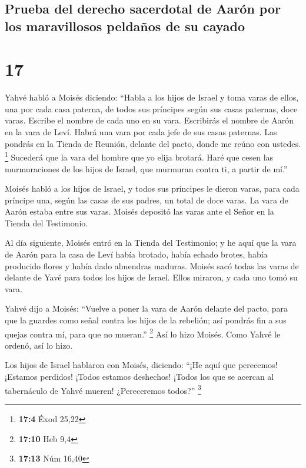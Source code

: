 \hypertarget{prueba-del-derecho-sacerdotal-de-aaruxf3n-por-los-maravillosos-peldauxf1os-de-su-cayado}{%
\subsection{Prueba del derecho sacerdotal de Aarón por los maravillosos
peldaños de su
cayado}\label{prueba-del-derecho-sacerdotal-de-aaruxf3n-por-los-maravillosos-peldauxf1os-de-su-cayado}}

\hypertarget{section-16}{%
\section{17}\label{section-16}}

 Yahvé habló a Moisés diciendo:  ``Habla a
los hijos de Israel y toma varas de ellos, una por cada casa paterna, de
todos sus príncipes según sus casas paternas, doce varas. Escribe el
nombre de cada uno en su vara.  Escribirás el nombre de
Aarón en la vara de Leví. Habrá una vara por cada jefe de sus casas
paternas.  Las pondrás en la Tienda de Reunión, delante
del pacto, donde me reúno con ustedes. \footnote{\textbf{17:4} Éxod
  25,22}  Sucederá que la vara del hombre que yo elija
brotará. Haré que cesen las murmuraciones de los hijos de Israel, que
murmuran contra ti, a partir de mí.''

 Moisés habló a los hijos de Israel, y todos sus príncipes
le dieron varas, para cada príncipe una, según las casas de sus padres,
un total de doce varas. La vara de Aarón estaba entre sus varas.
 Moisés depositó las varas ante el Señor en la Tienda del
Testimonio.

 Al día siguiente, Moisés entró en la Tienda del
Testimonio; y he aquí que la vara de Aarón para la casa de Leví había
brotado, había echado brotes, había producido flores y había dado
almendras maduras.  Moisés sacó todas las varas de delante
de Yavé para todos los hijos de Israel. Ellos miraron, y cada uno tomó
su vara.

 Yahvé dijo a Moisés: ``Vuelve a poner la vara de Aarón
delante del pacto, para que la guardes como señal contra los hijos de la
rebelión; así pondrás fin a sus quejas contra mí, para que no mueran.''
\footnote{\textbf{17:10} Heb 9,4}  Así lo hizo Moisés.
Como Yahvé le ordenó, así lo hizo.

 Los hijos de Israel hablaron con Moisés, diciendo: ``¡He
aquí que perecemos! ¡Estamos perdidos! ¡Todos estamos deshechos!
 ¡Todos los que se acercan al tabernáculo de Yahvé
mueren! ¿Pereceremos todos?'' \footnote{\textbf{17:13} Núm 16,40}

